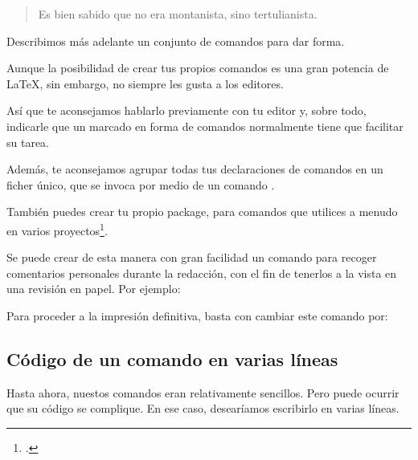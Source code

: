 \renewcommand{\autor}[2]{\textsc{#1}* (#2)}

\begin{quotation}
Es bien sabido que 
no era montanista, sino tertulianista.
\end{quotation}

Describimos más adelante un conjunto de comandos para dar forma.

\begin{attention}
Aunque la posibilidad de crear tus propios comandos es una gran potencia de \LaTeX, sin embargo, no siempre les gusta a los editores.
   
    Así que te aconsejamos hablarlo previamente con tu editor y, sobre todo, indicarle que un marcado en forma de comandos normalmente tiene que facilitar su tarea.
    
    Además, te aconsejamos agrupar todas tus declaraciones de comandos en un ficher único, que se invoca por medio de un comando .
    
    También puedes crear tu propio package, para comandos que utilices a menudo en varios proyectos\footcite[Eso desbordaría el marco de esta obra: te remito a otros documentos. Por ejemplo][]{creer_sty}.
\end{attention}


\begin{plusloins}\label{commentaireredac}
Se puede crear de esta manera con gran facilidad un comando  para recoger comentarios personales durante la redacción, con el fin de tenerlos a la vista en una revisión en papel.
Por ejemplo:

\begin{latexcode}
\newcommand{\comentario}[1]{\marginpar{#1}}
\end{latexcode}

Para proceder a la impresión definitiva, basta con cambiar este comando por:

\begin{latexcode}
\newcommand{\comentario}[1]{}
\end{latexcode}
\end{plusloins}

\subsection{Código de un comando en varias líneas}\label{commandepourcent}

Hasta ahora, nuestos comandos eran relativamente sencillos. Pero puede ocurrir que su código se complique. En ese caso, desearíamos escribirlo en varias líneas.

